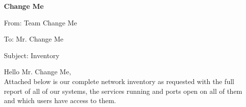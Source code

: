 \documentclass[12]{article}
\renewcommand{\title}[3]{
    \begin{left}
        \Large
        \textbf{#1}

        \vspace{0.4cm}
        \large
        From: #2

        \vspace{0.4cm}
        To: #3

        \vspace{0.4cm}
        Subject: Inventory
    \end{left}
}
\newcommand{\introduction}[1]{
    Hello #1, \\

    Attached below is our complete network inventory as requested with the full report of all of our systems, the services running and ports open on all of them and which users have access to them.
}
\begin{document}
\title{Change Me}{Team Change Me}{Mr. Change Me}

\vspace{0.9cm}

\introduction{Mr. Change Me}

\vspace{0.9cm}
\end{document}
